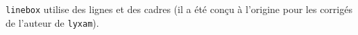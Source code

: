 %

\verb+linebox+ utilise des lignes et des cadres (il a été conçu à l'origine pour les corrigés de l'auteur de \verb+lyxam+).
